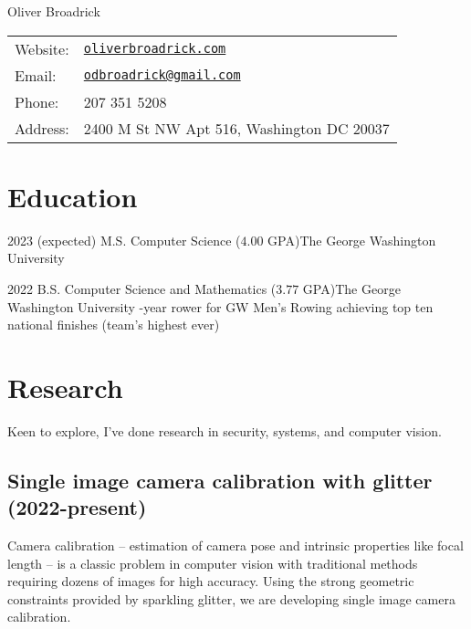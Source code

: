 \documentclass[letterpaper]{article}
\def\name{Oliver Broadrick}
\renewenvironment{itemize}{
  \begin{list}{}{
    \setlength{\leftmargin}{1.5em}
  }
}{
  \end{list}
}
\begin{document}
{\huge \name}

\vspace{0.25in}

\begin{minipage}{0.45\linewidth}
  \begin{tabular}{ll}
    Website: & \href{https://oliverbroadrick.com/}{\tt oliverbroadrick.com} \\
    Email: & \href{mailto:odbroadrick@gmail.com}{\tt odbroadrick@gmail.com} \\
    Phone: & 207 351 5208 \\
    Address: & 2400 M St NW Apt 516, Washington DC 20037
  \end{tabular}
\end{minipage}


\section*{Education}

\begin{itemize}

\item 2023 (expected) M.S. Computer Science ($4.00$ GPA)\hfill The George Washington University
\item 2022 B.S. Computer Science and Mathematics ($3.77$ GPA)\hfill The George Washington University
    -year rower for GW Men's Rowing achieving top ten national finishes (team's highest ever)

\end{itemize}

\section*{Research}

Keen to explore, I've done research in security, systems, and computer vision. 

\subsection*{Single image camera calibration with glitter (2022-present)}
Camera calibration -- estimation of camera pose and intrinsic properties like focal length -- is a classic problem in computer vision with traditional methods requiring dozens of images for high accuracy. Using the strong geometric constraints provided by sparkling glitter, we are developing single image camera calibration.
\end{document}
